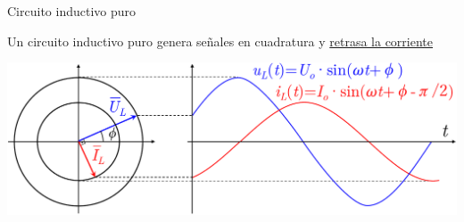 \documentclass[aspectratio=169, usenames,svgnames,dvipsnames]{beamer}
\begin{document}
\begin{frame}{Circuito inductivo puro}

    \vspace{2mm}
    Un circuito inductivo puro genera \alert{señales en cuadratura} y \underline{\alert{retrasa la corriente}}
    
    \begin{center}
        \includegraphics[height=0.37\textheight]{../figs/Fasores_inductancia.pdf}
    \end{center}  

    \vspace{-2mm}
    \begin{columns}
    \begin{column}{0.3\columnwidth}
    

\end{column}
\end{columns}
\end{frame}
\end{document}
